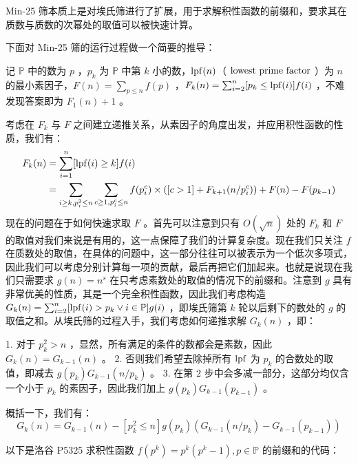 Min-25 筛本质上是对埃氏筛进行了扩展，用于求解积性函数的前缀和，要求其在质数与质数的次幂处的取值可以被快速计算。

下面对 Min-25 筛的运行过程做一个简要的推导：

记 $\mathbb P$ 中的数为 $p$ ，$p_k$ 为 $\mathbb P$ 中第 $k$ 小的数，${\rm lpf}(n)$（ $\rm lowest\ prime\ factor$ ）为 $n$ 的最小素因子，$F(n)=\sum_{p\le n}f(p)$ ，$F_k(n)=\sum_{i=2}^n[p_k\le{\rm lpf}(i)]f(i)$ ，不难发现答案即为 $F_1(n)+1$ 。

考虑在 $F_k$ 与 $F$ 之间建立递推关系，从素因子的角度出发，并应用积性函数的性质，我们有：
$$
\begin{aligned}
	F_k(n)&=\sum_{i=1}^n[{\rm lpf}(i)\ge k]f(i) \\
	&=\sum_{i\ge k,p_i^2\le n}\sum_{c\ge 1,p_i^c\le n} f(p_i^c)\times([c>1]+F_{k+1}(n/p_i^c))+F(n)-F(p_{k-1})\\
\end{aligned}
$$
现在的问题在于如何快速求取 $F$ 。首先可以注意到只有 $O(\sqrt n)$ 处的 $F_k$ 和 $F$ 的取值对我们来说是有用的，这一点保障了我们的计算复杂度。现在我们只关注 $f$ 在质数处的取值，在具体的问题中，这一部分往往可以被表示为一个低次多项式，因此我们可以考虑分别计算每一项的贡献，最后再把它们加起来。也就是说现在我们只需要求 $g(n)=n^s$ 在只考虑素数处的取值的情况下的前缀和。注意到 $g$ 具有非常优美的性质，其是一个完全积性函数，因此我们考虑构造 $G_k(n)=\sum_{i=2}^n[{\rm lpf}(i)>p_k \lor i \in {\mathbb P}]g(i)$ ，即埃氏筛第 $k$ 轮以后剩下的数处的 $g$ 的取值之和。从埃氏筛的过程入手，我们考虑如何递推求解 $G_k(n)$ ，即：

1. 对于 $p_k^2>n$ ，显然，所有满足的条件的数都会是素数，因此 $G_k(n)=G_{k-1}(n)$ 。
2. 否则我们希望去除掉所有 ${\rm lpf}$ 为 $p_k$ 的合数处的取值，即减去 $g(p_k)G_{k-1}(n/p_k)$ 。
3. 在第 $2$ 步中会多减一部分，这部分均仅含一个小于 $p_k$ 的素因子，因此我们加上 $g(p_k)G_{k-1}(p_{k-1})$ 。

概括一下，我们有：
$$
G_k(n)=G_{k-1}(n)-[p_k^2\le n]g(p_k)(G_{k-1}(n/p_k)-G_{k-1}(p_{k-1}))
$$

以下是洛谷 P5325 求积性函数 $f(p^k)=p^k(p^k-1),p\in\mathbb P$ 的前缀和的代码：
\inputminted{cpp}{src/number theory/min25.cpp}